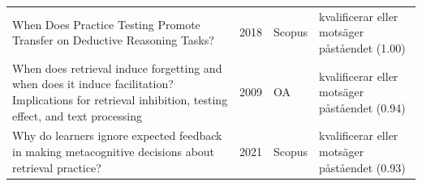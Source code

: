 \begin{longtable}{@{}%
  >{\raggedright\arraybackslash}p{}c%
  >{\raggedright\arraybackslash}p{}%
  >{\raggedright\arraybackslash}p{}@{}}
When Does Practice Testing Promote Transfer on Deductive Reasoning Tasks? & 2018 & Scopus & kvalificerar eller motsäger påståendet (1.00) \\
When does retrieval induce forgetting and when does it induce facilitation? Implications for retrieval inhibition, testing effect, and text processing & 2009 & OA & kvalificerar eller motsäger påståendet (0.94) \\
Why do learners ignore expected feedback in making metacognitive decisions about retrieval practice? & 2021 & Scopus & kvalificerar eller motsäger påståendet (0.93) \\
\end{longtable}
\endgroup
